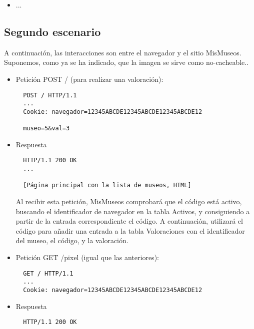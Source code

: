 {\begin{itemize}
\begin{verbatim}
  HTTP/1.1 200 OK

  [Foto, GIF]
\end{verbatim}

\item ...
\end{itemize}


\subsection*{Segundo escenario}

A continuación, las interacciones son entre el navegador y el sitio MisMuseos. Suponemos, como ya se ha indicado, que la imagen se sirve como no-cacheable..

\begin{itemize}
\item Petición POST / (para realizar una valoración):

\begin{verbatim}
  POST / HTTP/1.1
  ...
  Cookie: navegador=12345ABCDE12345ABCDE12345ABCDE12

  museo=5&val=3
\end{verbatim}

\item Respuesta

\begin{verbatim}
  HTTP/1.1 200 OK
  ...

  [Página principal con la lista de museos, HTML]
\end{verbatim}

Al recibir esta petición, MisMuseos comprobará que el código está activo, buscando el identificador de navegador en la tabla Activos, y consiguiendo a partir de la entrada correspondiente el código. A continuación, utilizará el código para añadir una entrada a la tabla Valoraciones con el identificador del museo, el código, y la valoración.

\item Petición GET /pixel (igual que las anteriores):

\begin{verbatim}
  GET / HTTP/1.1
  ...
  Cookie: navegador=12345ABCDE12345ABCDE12345ABCDE12
\end{verbatim}

\item Respuesta

\begin{verbatim}
  HTTP/1.1 200 OK


\end{verbatim}
\end{itemize}}
